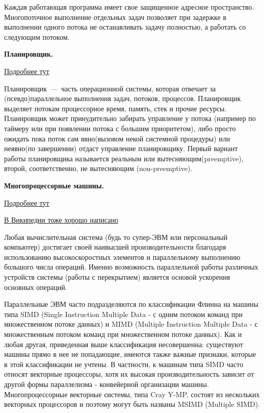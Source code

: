 \documentclass{article}
\begin{document}
Каждая работающая программа имеет свое защищенное адресное пространство. Многопоточное выполнение отдельных задач позволяет при задержке в выполнении одного потока не останавливать задачу полностью, а работать со следующим потоком.

\textbf{Планировщик.}

\href{https://habr.com/ru/post/154609/}{Подробнее тут}

Планировщик~---~часть операционной системы, которая отвечает за (псевдо)параллельное выполнения задач, потоков, процессов. Планировщик выделяет потокам процессорное время, память, стек и прочие ресурсы. Планировщик может принудительно забирать управление у потока (например по таймеру или при появлении потока с большим приоритетом), либо просто ожидать пока поток сам явно(вызовом некой системной процедуры) или неявно(по завершении) отдаст управление планировщику.
Первый вариант работы планировщика называется реальным или вытесняющим(preemptive), второй, соответственно, не вытесняющим (non-preemptive).

\textbf{Многопроцессорные машины.}

\href{https://docstore.mik.ua/skbd/glava_10.htm}{Подробнее тут}

\href{https://ru.wikipedia.org/wiki/%D0%9C%D0%BD%D0%BE%D0%B3%D0%BE%D0%BF%D1%80%D0%BE%D1%86%D0%B5%D1%81%D1%81%D0%BE%D1%80%D0%BD%D0%BE%D1%81%D1%82%D1%8C}{В Википедии тоже хорошо написано}

Любая вычислительная система (будь то супер-ЭВМ или персональный компьютер) достигает своей наивысшей производительности благодаря использованию высокоскоростных элементов и параллельному выполнению большого числа операций. Именно возможность параллельной работы различных устройств системы (работы с перекрытием) является основой ускорения основных операций. 

Параллельные ЭВМ часто подразделяются по классификации Флинна на машины типа SIMD (Single Instruction Multiple Data - с одним потоком команд при множественном потоке данных) и MIMD (Multiple Instruction Multiple Data - с множественным потоком команд при множественном потоке данных). Как и любая другая, приведенная выше классификация несовершенна: существуют машины прямо в нее не попадающие, имеются также важные признаки, которые в этой классификации не учтены. В частности, к машинам типа SIMD часто относят векторные процессоры, хотя их высокая производительность зависит от другой формы параллелизма - конвейерной организации машины. Многопроцессорные векторные системы, типа Cray Y-MP, состоят из нескольких векторных процессоров и поэтому могут быть названы MSIMD (Multiple SIMD).
\end{document}
